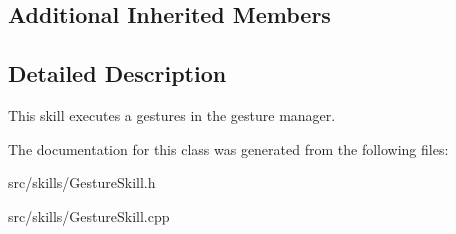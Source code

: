\subsection*{Additional Inherited Members}


\subsection{Detailed Description}
This skill executes a gestures in the gesture manager. 

The documentation for this class was generated from the following files\+:\begin{DoxyCompactItemize}
\item 
src/skills/Gesture\+Skill.\+h\item 
src/skills/Gesture\+Skill.\+cpp\end{DoxyCompactItemize}
